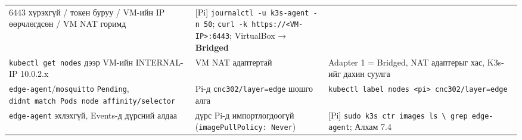 \begin{longtable}[]{@{}lll@{}}
\begin{minipage}[t]{0.30\columnwidth}
6443 хүрэхгүй / токен буруу / VM-ийн IP өөрчлөгдсөн / VM NAT горимд\strut
\end{minipage} & \begin{minipage}[t]{0.30\columnwidth}\raggedright
{[}Pi{]} \texttt{journalctl\ -u\ k3s-agent\ -n\ 50}; \texttt{curl\ -k\ https:\allowbreak{}/\allowbreak{}/\allowbreak{}\textless{}VM-IP\textgreater{}:\allowbreak{}6443}; VirtualBox → \textbf{Bridged}\strut
\end{minipage}\tabularnewline
\begin{minipage}[t]{0.30\columnwidth}\raggedright
\texttt{kubectl\ get\ nodes} дээр VM-ийн INTERNAL-IP 10.0.2.x\strut
\end{minipage} & \begin{minipage}[t]{0.30\columnwidth}\raggedright
VM NAT адаптертай\strut
\end{minipage} & \begin{minipage}[t]{0.30\columnwidth}\raggedright
Adapter 1 = Bridged, NAT адаптерыг хас, K3s-ийг дахин суулга\strut
\end{minipage}\tabularnewline
\begin{minipage}[t]{0.30\columnwidth}\raggedright
\texttt{edge-agent}/\allowbreak\texttt{mosquitto} \texttt{Pending}, \texttt{didn\textquotesingle{}t\ match\ Pod\textquotesingle{}s\ node\ affinity/selector}\strut
\end{minipage} & \begin{minipage}[t]{0.30\columnwidth}\raggedright
Pi-д \texttt{cnc302/\allowbreak{}layer=\allowbreak{}edge} шошго алга\strut
\end{minipage} & \begin{minipage}[t]{0.30\columnwidth}\raggedright
\texttt{kubectl\ label\ nodes\ \textless{}pi\textgreater{}\ cnc302/\allowbreak{}layer=\allowbreak{}edge}\strut
\end{minipage}\tabularnewline
\begin{minipage}[t]{0.30\columnwidth}\raggedright
\texttt{edge-agent} эхлэхгүй, Events-д дүрсний алдаа\strut
\end{minipage} & \begin{minipage}[t]{0.30\columnwidth}\raggedright
дүрс Pi-д импортлогдоогүй (\texttt{imagePullPolicy:\allowbreak{}\ Never})\strut
\end{minipage} & \begin{minipage}[t]{0.30\columnwidth}\raggedright
{[}Pi{]} \texttt{sudo\ k3s\ ctr\ images\ ls\ \textbackslash{}\textbar{}\ grep\ edge-agent}; Алхам 7.4\strut
\end{minipage}\tabularnewline

\end{longtable}
